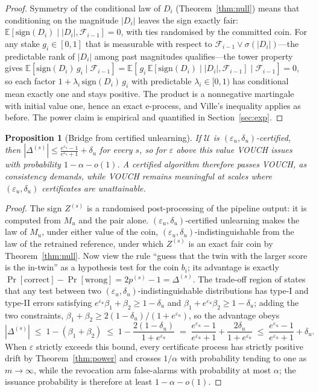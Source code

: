 \documentclass[pdflatex,sn-mathphys-num]{sn-jnl}
\theoremstyle{thmstyleone}
\newtheorem{proposition}[theorem]{Proposition}
\theoremstyle{thmstyletwo}
\theoremstyle{thmstylethree}
\newcommand{\F}{\mathcal{F}}
\newcommand{\Ucal}{\mathcal{U}}
\newcommand{\eps}{\varepsilon}
\newcommand{\Efrak}{\mathbb{E}}
\begin{document}
\begin{proof}
Symmetry of the conditional law of $D_i$ (Theorem~\ref{thm:null}) means that
conditioning on the magnitude $|D_i|$ leaves the sign exactly fair:
$\Efrak[\mathrm{sign}(D_i) \mid |D_i|, \F_{i-1}] = 0$, with ties randomised by the
committed coin. For any stake $g_i \in [0,1]$ that is measurable with respect to
$\F_{i-1} \vee \sigma(|D_i|)$---the predictable rank of $|D_i|$ among past magnitudes
qualifies---the tower property gives
$\Efrak[\mathrm{sign}(D_i)\, g_i \mid \F_{i-1}] = \Efrak[\,g_i\,
\Efrak[\mathrm{sign}(D_i) \mid |D_i|, \F_{i-1}] \mid \F_{i-1}] = 0$, so each factor
$1 + \lambda_i\, \mathrm{sign}(D_i)\, g_i$ with predictable $\lambda_i \in [0,1)$ has
conditional mean exactly one and stays positive. The product is a nonnegative
martingale with initial value one, hence an exact e-process, and Ville's inequality
applies as before. The power claim is empirical and quantified in
Section~\ref{sec:exp}.
\end{proof}

\begin{proposition}[Bridge from certified unlearning]\label{prop:bridge}
If $\Ucal$ is $(\eps_u,\delta_u)$-certified, then
$|\Delta^{(s)}| \le \tfrac{e^{\eps_u}-1}{e^{\eps_u}+1} + \delta_u$ for every $s$, so for
$\eps$ above this value VOUCH issues with probability $1 - \alpha - o(1)$. A certified
algorithm therefore passes VOUCH, as consistency demands, while VOUCH remains meaningful
at scales where $(\eps_u,\delta_u)$ certificates are unattainable.
\end{proposition}

\begin{proof}
The sign $Z^{(s)}$ is a randomised post-processing of the pipeline output: it is
computed from $M_u$ and the pair alone. $(\eps_u,\delta_u)$-certified unlearning makes
the law of $M_u$, under either value of the coin,
$(\eps_u,\delta_u)$-indistinguishable from the law of the retrained reference, under
which $Z^{(s)}$ is an exact fair coin by Theorem~\ref{thm:null}. Now view the rule
``guess that the twin with the larger score is the in-twin'' as a hypothesis test for
the coin $b_i$; its advantage is exactly
$\Pr[\text{correct}] - \Pr[\text{wrong}] = 2p^{(s)} - 1 = \Delta^{(s)}$. The
trade-off region of \citet{kairouz2015composition} states that any test between two
$(\eps_u,\delta_u)$-indistinguishable distributions has type-I and type-II errors
satisfying $e^{\eps_u}\beta_1 + \beta_2 \ge 1 - \delta_u$ and
$\beta_1 + e^{\eps_u}\beta_2 \ge 1 - \delta_u$; adding the two constraints,
$\beta_1 + \beta_2 \ge 2(1 - \delta_u)/(1 + e^{\eps_u})$, so the advantage obeys
\[
|\Delta^{(s)}| \;\le\; 1 - (\beta_1 + \beta_2)
\;\le\; 1 - \frac{2(1 - \delta_u)}{1 + e^{\eps_u}}
\;=\; \frac{e^{\eps_u} - 1}{e^{\eps_u} + 1} + \frac{2\delta_u}{1 + e^{\eps_u}}
\;\le\; \frac{e^{\eps_u} - 1}{e^{\eps_u} + 1} + \delta_u.
\]
When $\eps$ strictly exceeds this bound, every certificate process has strictly
positive drift by Theorem~\ref{thm:power} and crosses $1/\alpha$ with probability
tending to one as $m \to \infty$, while the revocation arm false-alarms with
probability at most $\alpha$; the issuance probability is therefore at least
$1 - \alpha - o(1)$.
\end{proof}
\end{document}

